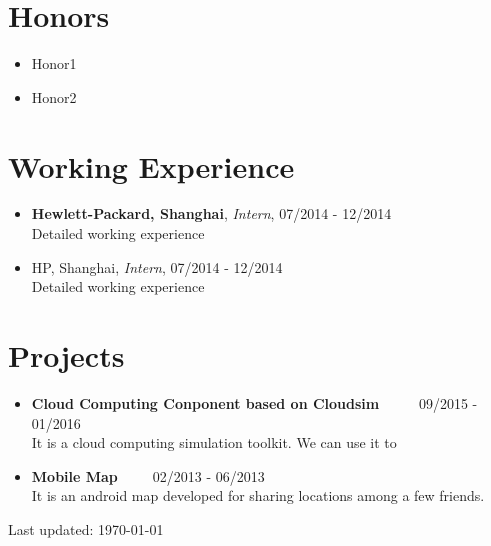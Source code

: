 \documentclass[letterpaper, UTF8]{article}
\begin{document}
	\section*{Honors}
	\begin{itemize}
		\item Honor1
		\item Honor2
	\end{itemize}
	\vspace{-0.25in}
	
	\section*{Working Experience}
	\begin{itemize}
		\item \textbf{Hewlett-Packard, Shanghai}, \emph{Intern}, 07/2014 - 12/2014  \\
		 Detailed working experience
		\item HP, Shanghai, \emph{Intern}, 07/2014 - 12/2014  \\
		 Detailed working experience
	\end{itemize}
	\vspace{-0.25in}
	
	\section*{Projects}
	\begin{itemize}
		\item \textbf{Cloud Computing Conponent based on Cloudsim}~~~~~ 09/2015 - 01/2016\\
		It is a cloud computing simulation toolkit. We can use it to 
		
		\item \textbf{Mobile Map}~~~~~02/2013 - 06/2013\\
		It is an android map developed for sharing locations among a few friends. 
	\end{itemize}
	\vspace{-0.25in}
	
	\bigskip
	\begin{center}
		\begin{footnotesize}
			Last updated: \today 
		\end{footnotesize}
	\end{center}
\end{document}
